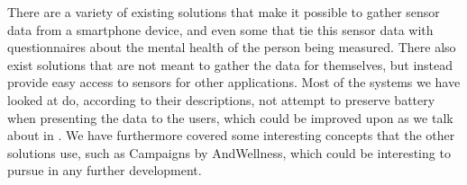 There are a variety of existing solutions that make it possible to gather sensor data from a smartphone device, and even some that tie this sensor data with questionnaires about the mental health of the person being measured. There also exist solutions that are not meant to gather the data for themselves, but instead provide easy access to sensors for other applications. Most of the systems we have looked at do, according to their descriptions, not attempt to preserve battery when presenting the data to the users, which could be improved upon as we talk about in . We have furthermore covered some interesting concepts that the other solutions use, such as Campaigns by AndWellness, which could be interesting to pursue in any further development. 
